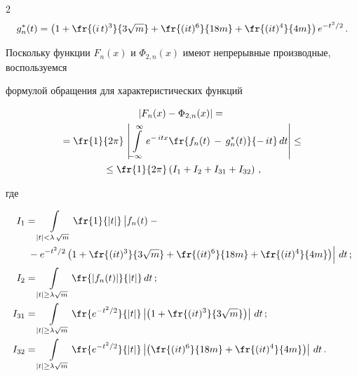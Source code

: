 \begin{multicols}{2}
\begin{align*}
\quad g^*_n(t) &=


\left(1+\fr{(i\,t)^3}{3\sqrt{m}}+\fr{(it)^6}{18m}+\fr{(it)^4}{4m} \right) e^{-t^2/2}\,. 


\end{align*}


Поскольку функции $F_n(x)$ и $\Phi_{2,n}(x)$ имеют непрерывные производные, воспользуемся 


формулой обращения для характеристических функций


\begin{multline*}


\left| F_n(x) - \Phi_{2,n}(x) \right| ={}\\


{}=  \fr{ 1}{ 2\pi}\,\left|


\int\limits_{-\infty}^\infty e^{-\,itx}\fr{f_n(t)\,-\,g^*_n(t)}{-\,it}\,dt \right| \leq{}\\


{}\leq  \fr{ 1}{ 2\pi}\left( I_1+I_2+I_{31}+I_{32}\right)\,, 


\end{multline*}


где


\begin{align*}


 I_1 &= \int\limits_{|t|<\lambda\,\sqrt{m}} \fr{1}{|t|}


\left|\vphantom{\fr{(it)^3}{\sqrt{m}}}


f_n(t)-{}\right.\\


&\left.{}-e^{-t^2/2}\left(1+\fr{(it)^3}{3\sqrt{m}}+


\fr{(it)^6}{18m}+\fr{(it)^4}{4m} \right) \right| \, dt\,;\\


 I_2&=\int\limits_{|t|\geq \lambda \sqrt{m}} \fr{|f_n(t)|}{|t|} \, dt \,;\\


  I_{31} &= \int\limits_{|t|\geq\lambda \sqrt{m}} \fr{e^{-t^2/2}}{|t|}


  \left|\left(1+\fr{(it)^3}{3\sqrt{m}}\right)\right| \,dt\,;\\


 I_{32}&= \int\limits_{|t|\geq\lambda \sqrt{m}} \fr{e^{-t^2/2}}{|t|}


  \left|\left(\fr{(it)^6}{18m}+\fr{(it)^4}{4m} \right) \right|\, dt\,.


  \end{align*}






\end{multicols}
